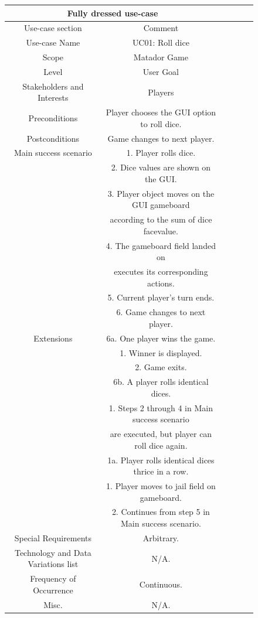 \begin{flushleft}
\begin{figure}[htp]
    \centering
\begin{tabular}{ |c|c|c|c|c|c|  }
\hline
\multicolumn{2}{|c|}{Fully dressed use-case} \\
\hline
Use-case section & Comment \\
\hline
Use-case Name & UC01: Roll dice\\
\hline
Scope & Matador Game\\
\hline
Level & User Goal\\
\hline
Stakeholders and Interests & Players\\
\hline
Preconditions & Player chooses the GUI option to roll dice.\\
\hline
Postconditions & Game changes to next player.\\
\hline
Main success scenario & 1. Player rolls dice.\\
                      & 2. Dice values are shown on the GUI.\\
                    & 3. Player object moves on the GUI gameboard\\
                    & according to the sum of dice facevalue.\\
                    & 4. The gameboard field landed on \\
                    & executes its corresponding actions.\\
                    & 5. Current player's turn ends.\\
                    & 6. Game changes to next player.\\
\hline
Extensions & 6a. One player wins the game. \\
                   & 1. Winner is displayed.\\
                   & 2. Game exits.       \\
                   & 6b. A player rolls identical dices. \\
                   & 1. Steps 2 through 4 in Main success scenario\\
                   & are executed, but player can roll dice again. \\
                   & 1a. Player rolls identical dices thrice in a row.\\
                   & 1. Player moves to jail field on gameboard. \\
                   & 2. Continues from step 5 in Main success scenario.\\
\hline
Special Requirements & Arbitrary.\\
\hline
Technology and Data Variations list & N/A.\\
\hline
Frequency of Occurrence & Continuous.\\
\hline
Misc. & N/A.\\
\hline


\end{tabular}
\end{figure}
\end{flushleft}
